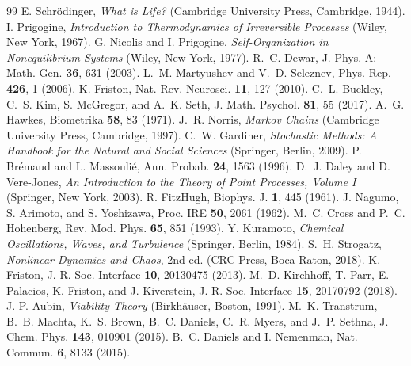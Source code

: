 \documentclass[11pt]{article}
\begin{document}
\clearpage
\begin{thebibliography}{99}
 E. Schr{\"o}dinger, \textit{What is Life?} (Cambridge University Press, Cambridge, 1944).
 I. Prigogine, \textit{Introduction to Thermodynamics of Irreversible Processes} (Wiley, New York, 1967).
 G. Nicolis and I. Prigogine, \textit{Self-Organization in Nonequilibrium Systems} (Wiley, New York, 1977).
 R.~C. Dewar, J. Phys. A: Math. Gen. \textbf{36}, 631 (2003).
 L.~M. Martyushev and V.~D. Seleznev, Phys. Rep. \textbf{426}, 1 (2006).
 K. Friston, Nat. Rev. Neurosci. \textbf{11}, 127 (2010).
 C.~L. Buckley, C.~S. Kim, S. McGregor, and A.~K. Seth, J. Math. Psychol. \textbf{81}, 55 (2017).
 A.~G. Hawkes, Biometrika \textbf{58}, 83 (1971).
 J.~R. Norris, \textit{Markov Chains} (Cambridge University Press, Cambridge, 1997).
 C.~W. Gardiner, \textit{Stochastic Methods: A Handbook for the Natural and Social Sciences} (Springer, Berlin, 2009).
 P. Br{\'e}maud and L. Massouli{\'e}, Ann. Probab. \textbf{24}, 1563 (1996).
 D.~J. Daley and D. Vere-Jones, \textit{An Introduction to the Theory of Point Processes, Volume I} (Springer, New York, 2003).
 R. FitzHugh, Biophys. J. \textbf{1}, 445 (1961).
 J. Nagumo, S. Arimoto, and S. Yoshizawa, Proc. IRE \textbf{50}, 2061 (1962).
 M.~C. Cross and P.~C. Hohenberg, Rev. Mod. Phys. \textbf{65}, 851 (1993).
 Y. Kuramoto, \textit{Chemical Oscillations, Waves, and Turbulence} (Springer, Berlin, 1984).
 S.~H. Strogatz, \textit{Nonlinear Dynamics and Chaos}, 2nd ed. (CRC Press, Boca Raton, 2018).
 K. Friston, J. R. Soc. Interface \textbf{10}, 20130475 (2013).
 M.~D. Kirchhoff, T. Parr, E. Palacios, K. Friston, and J. Kiverstein, J. R. Soc. Interface \textbf{15}, 20170792 (2018).
 J.-P. Aubin, \textit{Viability Theory} (Birkh{\"a}user, Boston, 1991).
 M.~K. Transtrum, B.~B. Machta, K.~S. Brown, B.~C. Daniels, C.~R. Myers, and J.~P. Sethna, J. Chem. Phys. \textbf{143}, 010901 (2015).
 B.~C. Daniels and I. Nemenman, Nat. Commun. \textbf{6}, 8133 (2015).
\end{thebibliography}
\end{document}

